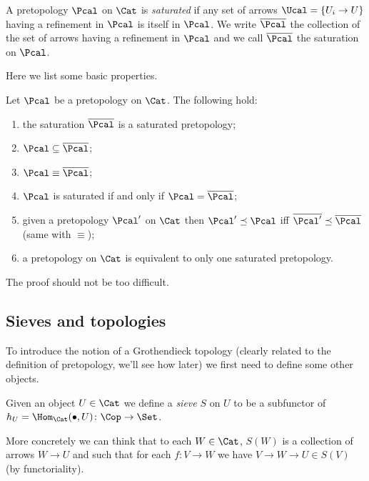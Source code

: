 \documentclass[a4paper]{article}
\begin{document}
            \begin{defn}
                A pretopology $\Pcal$ on $\Cat$ is \emph{saturated} if any set of arrows $\Ucal = \{U_i \to U\}$ having a refinement in $\Pcal$ is itself in $\Pcal$. We write $\overline{\Pcal}$ the collection of the set of arrows having a refinement in $\Pcal$ and we call $\overline{\Pcal}$ the saturation on $\Pcal$.
            \end{defn}
            Here we list some basic properties.
            \begin{prop}
                Let $\Pcal$ be a pretopology on $\Cat$. The following hold:
                \begin{enumerate}
                    \item the saturation $\overline{\Pcal}$ is a saturated pretopology;
                    \item $\Pcal \subseteq \overline{\Pcal}$;
                    \item $\Pcal \equiv \overline{\Pcal}$;
                    \item $\Pcal$ is saturated if and only if $\Pcal = \overline{\Pcal}$;
                    \item given a pretopology $\Pcal'$ on $\Cat$ then $\Pcal' \preceq \Pcal$ iff $\overline{\Pcal'} \preceq \overline{\Pcal}$ (same with $\equiv$);
                    \item a pretopology on $\Cat$ is equivalent to only one saturated pretopology.
                \end{enumerate}
            \end{prop}
            The proof should not be too difficult. 

        \subsection{Sieves and topologies}
            To introduce the notion of a Grothendieck topology (clearly related to the definition of pretopology, we'll see how later) we first need to define some other objects.
            \begin{defn}
                Given an object $U \in \Cat$ we define a \emph{sieve} $S$ on $U$ to be a subfunctor of $h_U = \Hom_{\Cat}(\bullet, U)\colon \Cop \to \Set$.
            \end{defn}
            More concretely we can think that to each $W \in \Cat$, $S(W)$ is a collection of arrows $W \to U$ and such that for each $f\colon V \to W$ we have $V \to W \to U \in S(V)$ (by functoriality).
\end{document}
